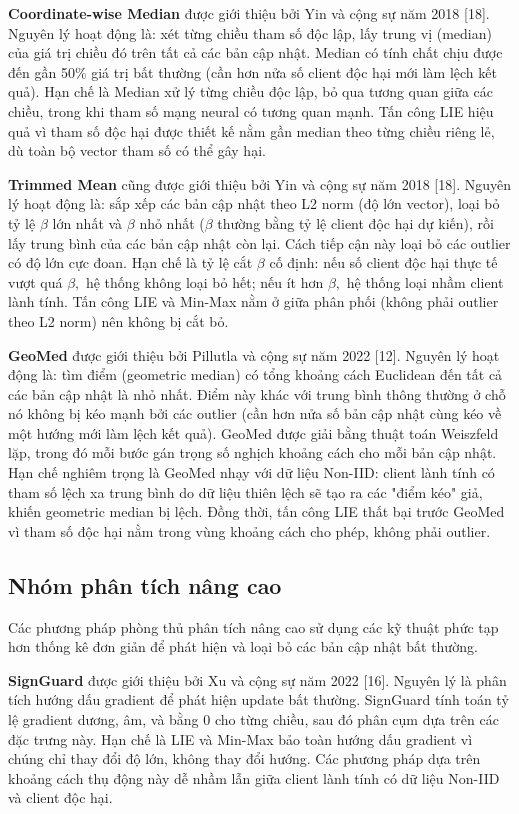 \textbf{Coordinate-wise Median} được giới thiệu bởi Yin và cộng sự năm 2018 {[}18{]}. Nguyên lý hoạt động là: xét từng chiều tham số độc lập, lấy trung vị (median) của giá trị chiều đó trên tất cả các bản cập nhật. Median có tính chất chịu được đến gần 50\% giá trị bất thường (cần hơn nửa số client độc hại mới làm lệch kết quả). Hạn chế là Median xử lý từng chiều độc lập, bỏ qua tương quan giữa các chiều, trong khi tham số mạng neural có tương quan mạnh. Tấn công LIE hiệu quả vì tham số độc hại được thiết kế nằm gần median theo từng chiều riêng lẻ, dù toàn bộ vector tham số có thể gây hại.

\textbf{Trimmed Mean} cũng được giới thiệu bởi Yin và cộng sự năm 2018 {[}18{]}. Nguyên lý hoạt động là: sắp xếp các bản cập nhật theo L2 norm (độ lớn vector), loại bỏ tỷ lệ $\beta$ lớn nhất và $\beta$ nhỏ nhất ($\beta$ thường bằng tỷ lệ client độc hại dự kiến), rồi lấy trung bình của các bản cập nhật còn lại. Cách tiếp cận này loại bỏ các outlier có độ lớn cực đoan. Hạn chế là tỷ lệ cắt $\beta$ cố định: nếu số client độc hại thực tế vượt quá $\beta,$ hệ thống không loại bỏ hết; nếu ít hơn $\beta,$ hệ thống loại nhầm client lành tính. Tấn công LIE và Min-Max nằm ở giữa phân phối (không phải outlier theo L2 norm) nên không bị cắt bỏ.

\textbf{GeoMed} được giới thiệu bởi Pillutla và cộng sự năm 2022 {[}12{]}. Nguyên lý hoạt động là: tìm điểm (geometric median) có tổng khoảng cách Euclidean đến tất cả các bản cập nhật là nhỏ nhất. Điểm này khác với trung bình thông thường ở chỗ nó không bị kéo mạnh bởi các outlier (cần hơn nửa số bản cập nhật cùng kéo về một hướng mới làm lệch kết quả). GeoMed được giải bằng thuật toán Weiszfeld lặp, trong đó mỗi bước gán trọng số nghịch khoảng cách cho mỗi bản cập nhật. Hạn chế nghiêm trọng là GeoMed nhạy với dữ liệu Non-IID: client lành tính có tham số lệch xa trung bình do dữ liệu thiên lệch sẽ tạo ra các "điểm kéo" giả, khiến geometric median bị lệch. Đồng thời, tấn công LIE thất bại trước GeoMed vì tham số độc hại nằm trong vùng khoảng cách cho phép, không phải outlier.

\subsection{Nhóm phân tích nâng cao}
Các phương pháp phòng thủ phân tích nâng cao sử dụng các kỹ thuật phức tạp hơn thống kê đơn giản để phát hiện và loại bỏ các bản cập nhật bất thường.

\textbf{SignGuard} được giới thiệu bởi Xu và cộng sự năm 2022 {[}16{]}. Nguyên lý là phân tích hướng dấu gradient để phát hiện update bất thường. SignGuard tính toán tỷ lệ gradient dương, âm, và bằng 0 cho từng chiều, sau đó phân cụm dựa trên các đặc trưng này. Hạn chế là LIE và Min-Max bảo toàn hướng dấu gradient vì chúng chỉ thay đổi độ lớn, không thay đổi hướng. Các phương pháp dựa trên khoảng cách thụ động này dễ nhầm lẫn giữa client lành tính có dữ liệu Non-IID và client độc hại.


